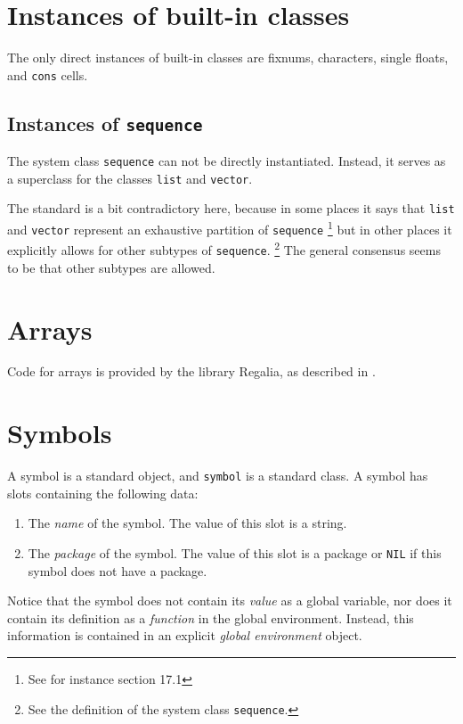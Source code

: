 \section{Instances of built-in classes}

The only direct instances of built-in classes are fixnums, characters,
single floats, and \texttt{cons} cells.

\subsection{Instances of \texttt{sequence}}

The system class \texttt{sequence} can not be directly instantiated.
Instead, it serves as a superclass for the classes \texttt{list} and
\texttt{vector}.

The standard is a bit contradictory here, because
in some places it says that \texttt{list} and \texttt{vector}
represent an exhaustive partition of \texttt{sequence}%
\footnote{See for instance section 17.1}
but in other places it explicitly allows for other subtypes of
\texttt{sequence}.%
\footnote{See the definition of the system class \texttt{sequence}.}
The general consensus seems to be that other subtypes are allowed.

\section{Arrays}
\label{sec-data-representation-arrays}

Code for arrays is provided by the library Regalia, as described in
.

\section{Symbols}

A symbol is a standard object, and \texttt{symbol} is a standard
class.  A symbol has slots containing the following data:

\begin{enumerate}
\item The \emph{name} of the symbol.  The value of this slot is a
  string.
\item The \emph{package} of the symbol.  The value of this slot is a
  package or \texttt{NIL} if this symbol does not have a package.
\end{enumerate}

Notice that the symbol does not contain its \emph{value} as a global
variable, nor does it contain its definition as a \emph{function} in
the global environment.  Instead, this information is contained in an
explicit \emph{global environment} object.

